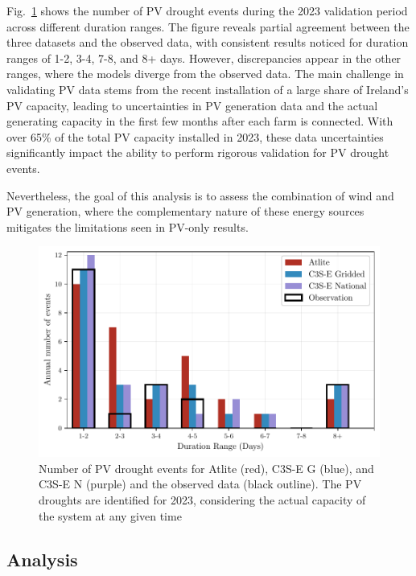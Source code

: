 \documentclass[preprint, 12pt, authoryear]{elsarticle}
\begin{document}
Fig.~\ref{fig:bar_number_events_verification_pv} shows the number of PV drought events during the 2023 validation period across different duration ranges. The figure reveals partial agreement between the three datasets and the observed data, with consistent results noticed for duration ranges of 1-2, 3-4, 7-8, and 8+ days. However, discrepancies appear in the other ranges, where the models diverge from the observed data. The main challenge in validating PV data stems from the recent installation of a large share of Ireland’s PV capacity, leading to uncertainties in PV generation data and the actual generating capacity in the first few months after each farm is connected. With over 65\% of the total PV capacity installed in 2023, these data uncertainties significantly impact the ability to perform rigorous validation for PV drought events. 

Nevertheless, the goal of this analysis is to assess the combination of wind and PV generation, where the complementary nature of these energy sources mitigates the limitations seen in PV-only results.

\begin{figure}[!ht]
	\centering
	\includegraphics[width=\textwidth]{verification_pv_number_events.pdf}
	\caption{Number of PV drought events for Atlite (red), C3S-E G (blue), and C3S-E N (purple) and the observed data (black outline). The PV droughts are identified for 2023, considering the actual capacity of the system at any given time}
	\label{fig:bar_number_events_verification_pv}
\end{figure}

\newpage
\subsection{Analysis}
\label{sec:Analysis}
\end{document}
